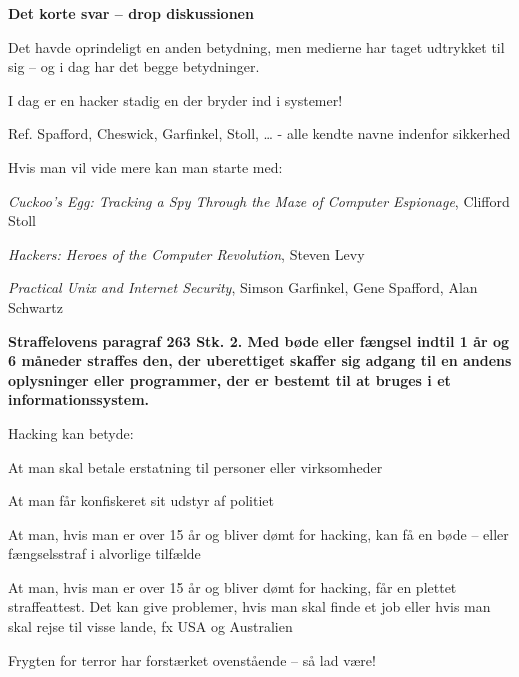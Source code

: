 \documentclass[20pt,landscape,a4paper,footrule]{foils}
\begin{document}

{\bfseries Det korte svar -- drop diskussionen}

Det havde oprindeligt en anden betydning, men medierne har taget
udtrykket til sig -- og i dag har det begge betydninger.

{\color{red}\hlkbig I dag er en hacker stadig en der bryder ind i systemer!}

Ref. Spafford, Cheswick, Garfinkel, Stoll, \ldots
- alle kendte navne indenfor sikkerhed

Hvis man vil vide mere kan man starte med:
\begin{list2}
\item \emph{Cuckoo's Egg: Tracking a Spy Through the Maze of Computer
 Espionage},  Clifford Stoll
\item \emph{Hackers: Heroes of the Computer Revolution},
Steven Levy
\item \emph{Practical Unix and Internet Security},
Simson Garfinkel, Gene Spafford, Alan Schwartz
\end{list2}


{\bfseries Straffelovens paragraf 263 Stk. 2. Med bøde eller fængsel indtil 1 år og 6 måneder straffes den, der uberettiget skaffer sig adgang til en andens oplysninger eller programmer, der er bestemt til at bruges i et informationssystem. }

Hacking kan betyde:
\begin{list2}
\item At man skal betale erstatning til personer eller virksomheder
\item At man får konfiskeret sit udstyr af politiet
\item At man, hvis man er over 15 år og bliver dømt for hacking, kan
  få en bøde -- eller fængselsstraf i alvorlige tilfælde
\item At man, hvis man er over 15 år og bliver dømt for hacking, får
en plettet straffeattest. Det kan give problemer, hvis man skal finde
et job eller hvis man skal rejse til visse lande, fx USA og
Australien
\item Frygten for terror har forstærket ovenstående -- så lad være!
\end{list2}


\end{document}
